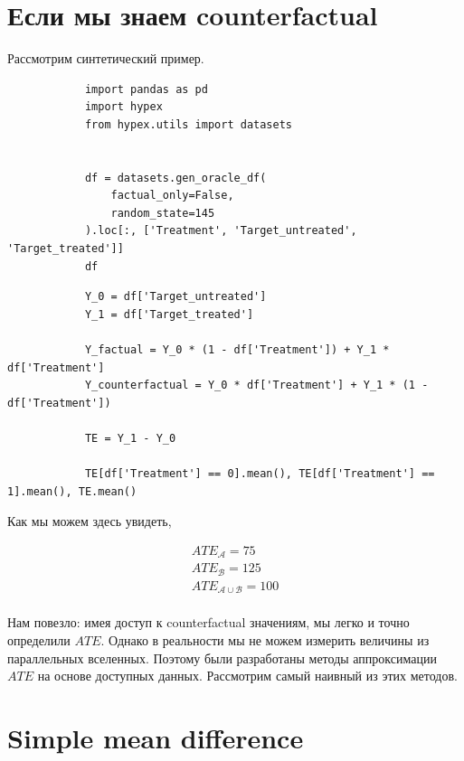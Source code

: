 \documentclass{article}
\begin{document}
    \section*{Если мы знаем counterfactual}

        Рассмотрим синтетический пример.

        \begin{verbatim}
            import pandas as pd
            import hypex
            from hypex.utils import datasets


            df = datasets.gen_oracle_df(
                factual_only=False,
                random_state=145
            ).loc[:, ['Treatment', 'Target_untreated', 'Target_treated']]
            df
        \end{verbatim}


        


        \begin{verbatim}
            Y_0 = df['Target_untreated']
            Y_1 = df['Target_treated']

            Y_factual = Y_0 * (1 - df['Treatment']) + Y_1 * df['Treatment']
            Y_counterfactual = Y_0 * df['Treatment'] + Y_1 * (1 - df['Treatment'])

            TE = Y_1 - Y_0

            TE[df['Treatment'] == 0].mean(), TE[df['Treatment'] == 1].mean(), TE.mean()
        \end{verbatim}

        Как мы можем здесь увидеть,

        \begin{gather*}
            ATE_{\mathcal{A}} = 75\\
            ATE_{\mathcal{B}} = 125\\
            ATE_{\mathcal{A} \cup \mathcal{B}} = 100\\
        \end{gather*}

        Нам повезло: имея доступ к counterfactual значениям, мы легко и точно определили $ATE$.
        Однако в реальности мы не можем измерить величины из параллельных вселенных.
        Поэтому были разработаны методы аппроксимации $ATE$ на основе доступных данных.
        Рассмотрим самый наивный из этих методов.

    \section*{Simple mean difference}
\end{document}

